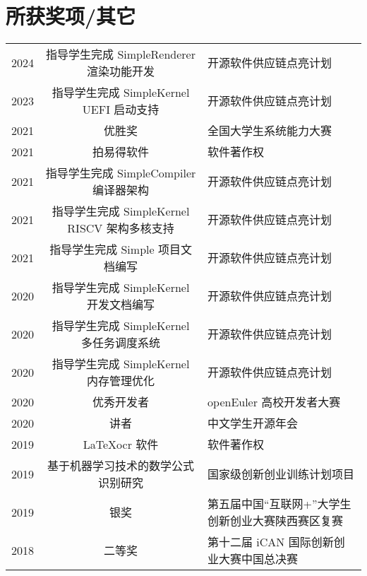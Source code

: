 \documentclass{resume}
\begin{document}
\section{所获奖项/其它} 
\begin{tabular}{rcl}
    2024         & 指导学生完成 SimpleRenderer 渲染功能开发 & 开源软件供应链点亮计划 \\
    2023         & 指导学生完成 SimpleKernel UEFI 启动支持 & 开源软件供应链点亮计划 \\
    2021         & 优胜奖 & 全国大学生系统能力大赛 \\ 
    2021         & 拍易得软件 & 软件著作权 \\
    2021         & 指导学生完成 SimpleCompiler 编译器架构 & 开源软件供应链点亮计划 \\
    2021         & 指导学生完成 SimpleKernel RISCV 架构多核支持 & 开源软件供应链点亮计划 \\
    2021         & 指导学生完成 Simple 项目文档编写 & 开源软件供应链点亮计划 \\
    2020         & 指导学生完成 SimpleKernel 开发文档编写 & 开源软件供应链点亮计划 \\
    2020         & 指导学生完成 SimpleKernel 多任务调度系统 & 开源软件供应链点亮计划 \\
    2020         & 指导学生完成 SimpleKernel 内存管理优化 & 开源软件供应链点亮计划 \\
    2020         & 优秀开发者 & openEuler 高校开发者大赛 \\ 
    2020         & 讲者 & 中文学生开源年会 \\
    2019         & LaTeXocr 软件 & 软件著作权 \\
    2019         & 基于机器学习技术的数学公式识别研究 & 国家级创新创业训练计划项目 \\
    2019         & 银奖    & 第五届中国“互联网+”大学生创新创业大赛陕西赛区复赛 \\
    2018         & 二等奖  & 第十二届 iCAN 国际创新创业大赛中国总决赛 \\
\end{tabular}
\sectionsep
\end{document}
